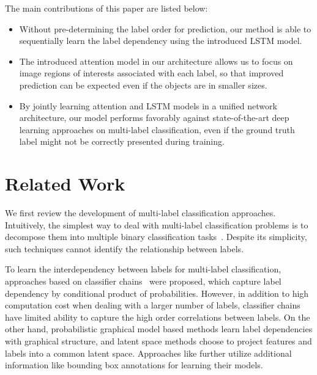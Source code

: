 \documentclass[letterpaper]{article} %
\begin{document}

The main contributions of this paper are listed below: %
\begin{itemize}
	\item Without pre-determining the label order for prediction, our method is able to sequentially learn the label dependency using the introduced LSTM model.
	\item The introduced attention model in our architecture allows us to focus on image regions of interests associated with each label, so that improved prediction can be expected even if the objects are in smaller sizes.
	\item By jointly learning attention and LSTM models in a unified network architecture, our model performs favorably against state-of-the-art deep learning approaches on multi-label classification, even if the ground truth label might not be correctly presented during training.
\end{itemize}


\section{Related Work}
\label{sec:rewo}
We first review the development of multi-label classification approaches. Intuitively, the simplest way to deal with multi-label classification problems is to decompose them into multiple binary classification tasks~\cite{tsoumakas2006multi}. Despite its simplicity, such techniques cannot identify the relationship between labels.

To learn the interdependency between labels for multi-label classification, approaches based on classifier chains~\cite{read2011classifier} were proposed, which capture label dependency by conditional product of probabilities. However, in addition to high computation cost when dealing with a larger number of labels, classifier chains have limited ability to capture the high order correlations between labels. On the other hand, probabilistic graphical model based methods  \cite{li2014multi,li2016conditional} learn label dependencies with graphical structure, and latent space methods \cite{yeh2017learning,bhatia2015sparse} choose to project features and labels into a common latent space. Approaches like \cite{yang2016exploit} further utilize additional information like bounding box annotations for learning their models.
\end{document}
